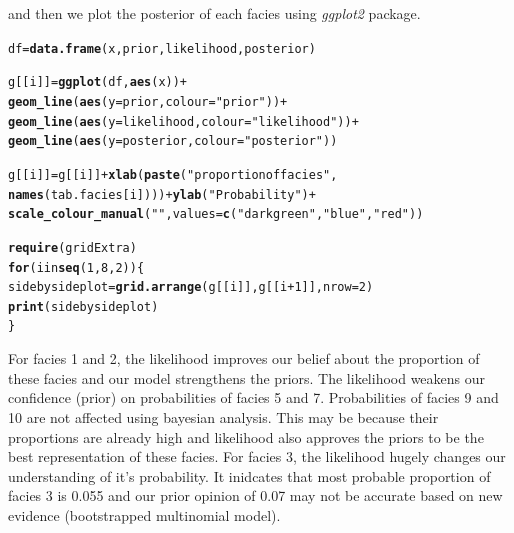 \documentclass[paper=a4, fontsize=12pt]{scrartcl}\usepackage{graphicx, color}
\makeatletter
\newcommand{\hlfunctioncall}[1]{\textcolor[rgb]{0.501960784313725,0,0.329411764705882}{\textbf{#1}}}%
\newcommand{\hlstring}[1]{\textcolor[rgb]{0.6,0.6,1}{#1}}%
\newenvironment{kframe}{%
 \def\at@end@of@kframe{}%
 \ifinner\ifhmode%
  \def\at@end@of@kframe{\end{minipage}}%
  \begin{minipage}{\columnwidth}%
 \fi\fi%
 \def\FrameCommand##1{\hskip\@totalleftmargin \hskip-\fboxsep
 \colorbox{shadecolor}{##1}\hskip-\fboxsep
     \hskip-\linewidth \hskip-\@totalleftmargin \hskip\columnwidth}%
 \MakeFramed {\advance\hsize-\width
   \@totalleftmargin\z@ \linewidth\hsize
   \@setminipage}}%
 {\par\unskip\endMakeFramed%
 \at@end@of@kframe}
\newenvironment{knitrout}{}{} %
\numberwithin{equation}{section} %
\numberwithin{figure}{section} %
\numberwithin{table}{section} %
\makeatother
\begin{document}
and then we plot the posterior of each facies using 
\textit{ggplot2} package. 
\begin{knitrout}
\color{fgcolor}\begin{kframe}
\begin{alltt}
  df       = \hlfunctioncall{data.frame}(x,prior,likelihood,posterior)
  
  g[[i]]   = \hlfunctioncall{ggplot}( df, \hlfunctioncall{aes}(x)) +                   
                    \hlfunctioncall{geom_line}(\hlfunctioncall{aes}(y=prior,colour=\hlstring{"prior"})) +  
                    \hlfunctioncall{geom_line}(\hlfunctioncall{aes}(y=likelihood,colour=\hlstring{"likelihood"})) +  
                    \hlfunctioncall{geom_line}(\hlfunctioncall{aes}(y=posterior,colour=\hlstring{"posterior"}) )
  
  g[[i]]  = g[[i]] + \hlfunctioncall{xlab}(\hlfunctioncall{paste}(\hlstring{"proportion of facies "}, 
                     \hlfunctioncall{names}(tab.facies[i]))) + \hlfunctioncall{ylab}(\hlstring{"Probability"})+
                     \hlfunctioncall{scale_colour_manual}(\hlstring{""},values=\hlfunctioncall{c}(\hlstring{"darkgreen"},\hlstring{"blue"},\hlstring{"red"}))


\hlfunctioncall{require}(gridExtra)
\hlfunctioncall{for} (i in \hlfunctioncall{seq}(1,8,2))\{
  sidebysideplot = \hlfunctioncall{grid.arrange}(g[[i]], g[[i+1]], nrow=2)
  \hlfunctioncall{print}(sidebysideplot)
\}
\end{alltt}
\end{kframe}
\end{knitrout}

For facies 1 and 2, the likelihood improves our belief about the proportion of these facies and our model strengthens the priors. The likelihood weakens our confidence (prior) on probabilities of facies 5 and 7. Probabilities of facies 9 and 10 are not affected using bayesian analysis. This may be because their proportions are already high and likelihood also approves the priors to be the best representation of these facies. For facies 3, the likelihood hugely changes our understanding of it's probability. It inidcates that most probable proportion of facies 3 is 0.055 and our prior opinion of 0.07 may not be accurate based on new evidence (bootstrapped multinomial model). 
\end{document}
